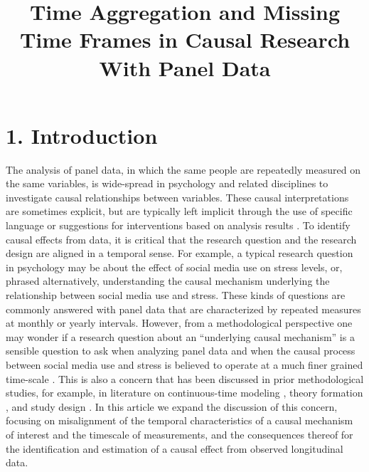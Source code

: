 \documentclass[man]{apa7} %
\title{Time Aggregation and Missing Time Frames in Causal Research With Panel Data}
\begin{document}
\maketitle


\section{1. Introduction}
The analysis of panel data, in which the same people are repeatedly measured on the same variables, is wide-spread in psychology and related disciplines to investigate causal relationships between variables. These causal interpretations are sometimes explicit, but are typically left implicit through the use of specific language or suggestions for interventions based on analysis results \parencite{asendorpf_modeling_2021, grosz_taboo_2020, hamaker_description_2020}. To identify causal effects from data, it is critical that the research question and the research design are aligned in a temporal sense. For example, a typical research question in psychology may be about the effect of social media use on stress levels, or, phrased alternatively, understanding the causal mechanism underlying the relationship between social media use and stress. These kinds of questions are commonly answered with panel data that are characterized by repeated measures at monthly or yearly intervals. However, from a methodological perspective one may wonder if a research question about an ``underlying causal mechanism'' is a sensible question to ask when analyzing panel data and when the causal process between social media use and stress is believed to operate at a much finer grained time-scale \parencite[e.g., within-day or day-to-day;][]{collins_effect_2002}. This is also a concern that has been discussed in prior methodological studies, for example, in literature on continuous-time modeling \parencites[cf.][]{voelkle_sem_2012, voelkle_role_2018, batra_consequences_2023}, theory formation \parencite{mitchell_building_2001}, and study design \parencites[cf.][]{collins_effect_2002, collins_analysis_2006, hamaker_within-between_2023}. In this article we expand the discussion of this concern, focusing on misalignment of the temporal characteristics of a causal mechanism of interest and the timescale of measurements, and the consequences thereof for the identification and estimation of a causal effect from observed longitudinal data.
\end{document}
